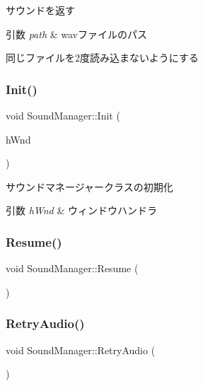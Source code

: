 サウンドを返す 


\begin{DoxyParams}{引数}
{\em path} & wavファイルのパス\\
\hline
\end{DoxyParams}
同じファイルを2度読み込まないようにする \mbox{\label{class_sound_manager_adab2bc016911756ffd973c7d781b5cfb}} 
\subsubsection{\texorpdfstring{Init()}{Init()}}
{\footnotesize\ttfamily void Sound\+Manager\+::\+Init (\begin{DoxyParamCaption}\item[{H\+W\+ND}]{h\+Wnd }\end{DoxyParamCaption})}



サウンドマネージャークラスの初期化 


\begin{DoxyParams}{引数}
{\em h\+Wnd} & ウィンドウハンドラ \\
\hline
\end{DoxyParams}
\mbox{\label{class_sound_manager_a6107940d2299131fbd7991a4f222491b}} 
\subsubsection{\texorpdfstring{Resume()}{Resume()}}
{\footnotesize\ttfamily void Sound\+Manager\+::\+Resume (\begin{DoxyParamCaption}{ }\end{DoxyParamCaption})\hspace{0.3cm}{\ttfamily [inline]}}

\mbox{\label{class_sound_manager_acc9fb61509f30c7eb9136386eeeb9f94}} 
\subsubsection{\texorpdfstring{Retry\+Audio()}{RetryAudio()}}
{\footnotesize\ttfamily void Sound\+Manager\+::\+Retry\+Audio (\begin{DoxyParamCaption}{ }\end{DoxyParamCaption})\hspace{0.3cm}{\ttfamily [inline]}}


